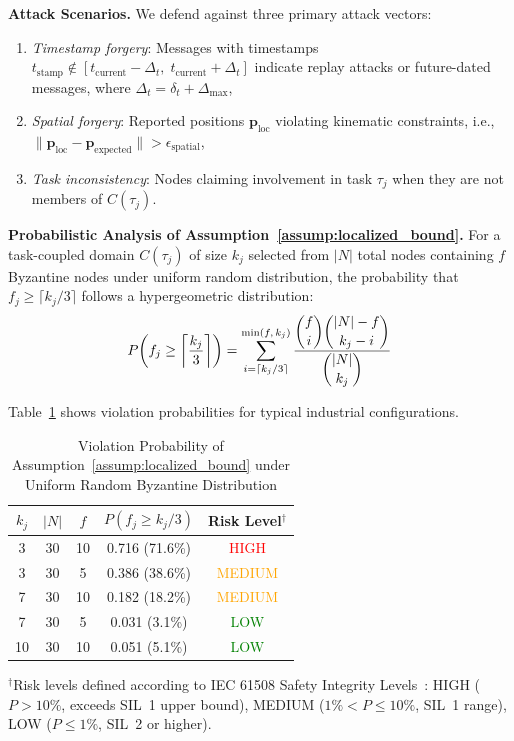\documentclass[manuscript,screen,review]{acmart}
\begin{document}
\textbf{Attack Scenarios.}
We defend against three primary attack vectors:
\begin{enumerate}
    \item \textit{Timestamp forgery}: Messages with timestamps $t_{\text{stamp}} \notin [t_{\text{current}} - \Delta_t,\; t_{\text{current}} + \Delta_t]$ indicate replay attacks or future-dated messages, where $\Delta_t = \delta_t + \Delta_{\max}$,
    \item \textit{Spatial forgery}: Reported positions $\mathbf{p}_{\text{loc}}$ violating kinematic constraints, i.e., $\|\mathbf{p}_{\text{loc}} - \mathbf{p}_{\text{expected}}\| > \epsilon_{\text{spatial}}$,
    \item \textit{Task inconsistency}: Nodes claiming involvement in task $\tau_j$ when they are not members of $C(\tau_j)$.
\end{enumerate}

\textbf{Probabilistic Analysis of Assumption~\ref{assump:localized_bound}.}
For a task-coupled domain $C(\tau_j)$ of size $k_j$ selected from $|N|$ total nodes containing $f$ Byzantine nodes under uniform random distribution, the probability that $f_j \geq \lceil k_j/3 \rceil$ follows a hypergeometric distribution:
\begin{equation}
\begin{aligned}
P\!\left(f_j \geq \left\lceil \frac{k_j}{3} \right\rceil\right) =
\sum_{i=\lceil k_j/3 \rceil}^{\min(f,\,k_j)}
\frac{\dbinom{f}{i}\dbinom{|N|-f}{k_j-i}}{\dbinom{|N|}{k_j}}
\label{eq:violation_prob}
\end{aligned}
\end{equation}

Table~\ref{tab:violation_prob} shows violation probabilities for typical industrial configurations.

\begin{table}[h]
\centering
\caption{Violation Probability of Assumption~\ref{assump:localized_bound} under Uniform Random Byzantine Distribution}
\label{tab:violation_prob}
\small
\begin{tabular}{ccccc}
\toprule
$k_j$ & $|N|$ & $f$ & $P(f_j \geq k_j/3)$ & \textbf{Risk Level}$^{\dagger}$ \\
\midrule
3  & 30 & 10 & 0.716 (71.6\%) & \textcolor{red}{HIGH} \\
3  & 30 & 5  & 0.386 (38.6\%) & \textcolor{orange}{MEDIUM} \\
7  & 30 & 10 & 0.182 (18.2\%) & \textcolor{orange}{MEDIUM} \\
7  & 30 & 5  & 0.031 (3.1\%)  & \textcolor{green}{LOW} \\
10 & 30 & 10 & 0.051 (5.1\%)  & \textcolor{green}{LOW} \\
\bottomrule
\end{tabular}
\vspace{0.2cm}

\noindent $^{\dagger}$Risk levels defined according to IEC 61508 Safety Integrity Levels~\cite{iec61508}: HIGH ($P > 10\%$, exceeds SIL~1 upper bound), MEDIUM ($1\% < P \leq 10\%$, SIL~1 range), LOW ($P \leq 1\%$, SIL~2 or higher).
\end{table}
\end{document}
